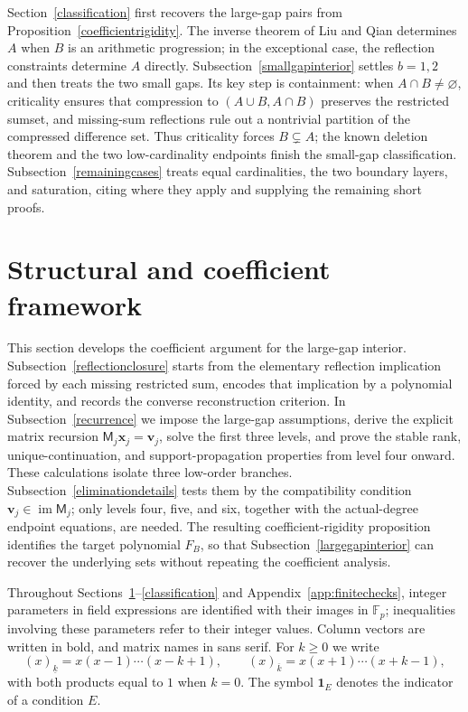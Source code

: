 \documentclass[10pt,a4paper]{amsart}
\newcommand{\F}{\mathbb{F}_p}
\newcommand{\fall}[2]{(#1)_{\underline{#2}}}
\newcommand{\rise}[2]{(#1)_{\overline{#2}}}
\newcommand{\ind}{\mathbf 1}
\begin{document}
Section~\ref{classification} first recovers the large-gap pairs from
Proposition~\ref{coefficientrigidity}.  The inverse theorem of Liu and
Qian \cite[Theorem 1.5(ii)]{LQ} determines $A$ when $B$ is an arithmetic progression;
in the exceptional case, the reflection constraints determine $A$ directly.  Subsection~\ref{smallgapinterior} settles $b=1,2$
and then treats the two small gaps.  Its key step is containment:
when $A\cap B\ne\varnothing$, criticality ensures that compression
to $(A\cup B,A\cap B)$ preserves the restricted sumset,
and missing-sum reflections rule out a nontrivial partition of the
compressed difference set.  Thus criticality forces $B\subsetneq A$;
the known deletion theorem and the two low-cardinality endpoints finish
the small-gap classification.  Subsection~\ref{remainingcases} treats
equal cardinalities, the two boundary layers, and saturation, citing
\cite{DGHM,HLY} where they apply and supplying the remaining short proofs.

\section{Structural and coefficient framework}\label{structure}

This section develops the coefficient argument for the large-gap interior.
Subsection~\ref{reflectionclosure} starts from the elementary reflection
implication forced by each missing restricted sum, encodes that implication
by a polynomial identity, and records the converse reconstruction criterion.
In Subsection~\ref{recurrence} we impose the large-gap assumptions,
derive the explicit matrix recursion
$\mathsf M_j\mathbf x_j=\mathbf v_j$, solve the first three levels, and
prove the stable rank, unique-continuation, and support-propagation
properties from level four onward.  These calculations isolate three
low-order branches.  Subsection~\ref{eliminationdetails} tests them by
the compatibility condition $\mathbf v_j\in\operatorname{im}\mathsf M_j$;
only levels four, five, and six, together with the actual-degree endpoint
equations, are needed.  The resulting coefficient-rigidity proposition
identifies the target polynomial $F_B$, so that
Subsection~\ref{largegapinterior} can recover the underlying sets without
repeating the coefficient analysis.

Throughout Sections~\ref{structure}--\ref{classification} and
Appendix~\ref{app:finitechecks}, integer parameters in field expressions
are identified with their images in $\F$; inequalities involving these
parameters refer to their integer values.  Column vectors are written in
bold, and matrix names in sans serif.  For $k\ge0$ we write
\[
 \fall{x}{k}=x(x-1)\cdots(x-k+1),\qquad
 \rise{x}{k}=x(x+1)\cdots(x+k-1),
\]
with both products equal to $1$ when $k=0$.  The symbol $\ind_E$ denotes
the indicator of a condition $E$.
\end{document}
